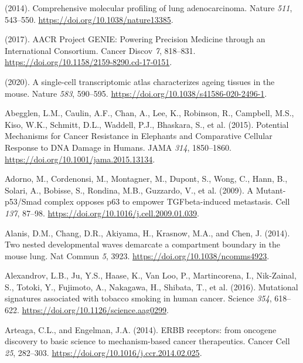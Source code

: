 \hypertarget{refs}{}
\begin{CSLReferences}{0}{0}
\leavevmode{}%
(2014). Comprehensive molecular profiling of lung adenocarcinoma. Nature \emph{511}, 543--550. \url{https://doi.org/10.1038/nature13385}.

\leavevmode{}%
(2017). AACR Project GENIE: Powering Precision Medicine through an International Consortium. Cancer Discov \emph{7}, 818--831. \url{https://doi.org/10.1158/2159-8290.cd-17-0151}.

\leavevmode{}%
(2020). A single-cell transcriptomic atlas characterizes ageing tissues in the mouse. Nature \emph{583}, 590--595. \url{https://doi.org/10.1038/s41586-020-2496-1}.

\leavevmode{}%
Abegglen, L.M., Caulin, A.F., Chan, A., Lee, K., Robinson, R., Campbell, M.S., Kiso, W.K., Schmitt, D.L., Waddell, P.J., Bhaskara, S., et al. (2015). Potential Mechanisms for Cancer Resistance in Elephants and Comparative Cellular Response to DNA Damage in Humans. JAMA \emph{314}, 1850--1860. \url{https://doi.org/10.1001/jama.2015.13134}.

\leavevmode{}%
Adorno, M., Cordenonsi, M., Montagner, M., Dupont, S., Wong, C., Hann, B., Solari, A., Bobisse, S., Rondina, M.B., Guzzardo, V., et al. (2009). A Mutant-p53/Smad complex opposes p63 to empower TGFbeta-induced metastasis. Cell \emph{137}, 87--98. \url{https://doi.org/10.1016/j.cell.2009.01.039}.

\leavevmode{}%
Alanis, D.M., Chang, D.R., Akiyama, H., Krasnow, M.A., and Chen, J. (2014). Two nested developmental waves demarcate a compartment boundary in the mouse lung. Nat Commun \emph{5}, 3923. \url{https://doi.org/10.1038/ncomms4923}.

\leavevmode{}%
Alexandrov, L.B., Ju, Y.S., Haase, K., Van Loo, P., Martincorena, I., Nik-Zainal, S., Totoki, Y., Fujimoto, A., Nakagawa, H., Shibata, T., et al. (2016). Mutational signatures associated with tobacco smoking in human cancer. Science \emph{354}, 618--622. \url{https://doi.org/10.1126/science.aag0299}.

\leavevmode{}%
Arteaga, C.L., and Engelman, J.A. (2014). ERBB receptors: from oncogene discovery to basic science to mechanism-based cancer therapeutics. Cancer Cell \emph{25}, 282--303. \url{https://doi.org/10.1016/j.ccr.2014.02.025}.


\end{CSLReferences}
